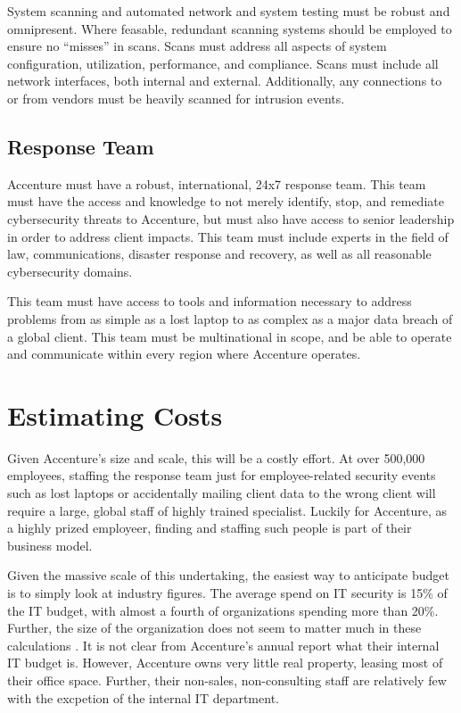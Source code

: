 System scanning and automated network and system testing must be robust and omnipresent. Where feasable, redundant scanning systems should be employed to ensure no ``misses'' in scans. Scans must address all aspects of system configuration, utilization, performance, and compliance. Scans must include all network interfaces, both internal and external. Additionally, any connections to or from vendors must be heavily scanned for intrusion events.

\subsection{Response Team}

Accenture must have a robust, international, 24x7 response team. This team must have the access and knowledge to not merely identify, stop, and remediate cybersecurity threats to Accenture, but must also have access to senior leadership in order to address client impacts. This team must include experts in the field of law, communications, disaster response and recovery, as well as all reasonable cybersecurity domains.

This team must have access to tools and information necessary to address problems from as simple as a lost laptop to as complex as a major data breach of a global client. This team must be multinational in scope, and be able to operate and communicate within every region where Accenture operates.

\section{Estimating Costs}

Given Accenture's size and scale, this will be a costly effort. At over 500,000 employees, staffing the response team just for employee-related security events such as lost laptops or accidentally mailing client data to the wrong client will require a large, global staff of highly trained specialist. Luckily for Accenture, as a highly prized employeer, finding and staffing such people is part of their business model. 

Given the massive scale of this undertaking, the easiest way to anticipate budget is to simply look at industry figures. The average spend on IT security is 15\% of the IT budget, with almost a fourth of organizations spending more than 20\%. Further, the size of the organization does not seem to matter much in these calculations \parencite{violinoHowMuchShould2019}. It is not clear from Accenture's annual report what their internal IT budget is. However, Accenture owns very little real property, leasing most of their office space. Further, their non-sales, non-consulting staff are relatively few with the excpetion of the internal IT department. 

